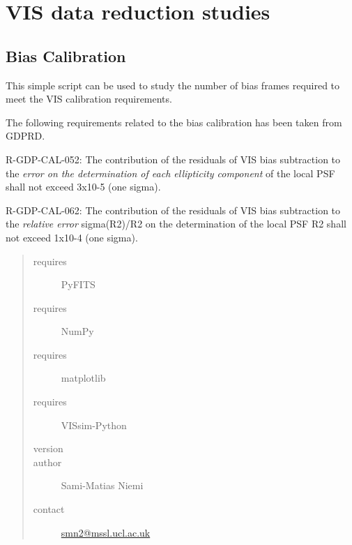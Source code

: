 \documentclass[a4paper,12pt,english]{sphinxmanual}
\begin{document}
\section{VIS data reduction studies}
\label{reduction:vis-data-reduction-studies}\label{reduction:module-analysis.biasCalibration}

\subsection{Bias Calibration}
\label{reduction:bias-calibration}
This simple script can be used to study the number of bias frames required to meet the VIS calibration requirements.

The following requirements related to the bias calibration has been taken from GDPRD.

R-GDP-CAL-052:
The contribution of the residuals of VIS bias subtraction to the \emph{error on the determination of each ellipticity
component} of the local PSF shall not exceed 3x10-5 (one sigma).

R-GDP-CAL-062:
The contribution of the residuals of VIS bias subtraction to the \emph{relative error} sigma(R2)/R2 on the determination of
the local PSF R2 shall not exceed 1x10-4 (one sigma).
\begin{quote}\begin{description}
\item[{requires}] \leavevmode
PyFITS

\item[{requires}] \leavevmode
NumPy

\item[{requires}] \leavevmode
matplotlib

\item[{requires}] \leavevmode
VISsim-Python

\item[{version}] 

\item[{author}] \leavevmode
Sami-Matias Niemi

\item[{contact}] \leavevmode
\href{mailto:smn2@mssl.ucl.ac.uk}{smn2@mssl.ucl.ac.uk}

\end{description}\end{quote}
\end{document}

